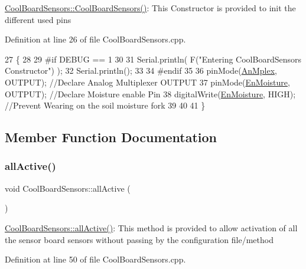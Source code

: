 \hyperlink{class_cool_board_sensors_a91ff2a02f5486f90cf2413a1cf8a9ed4}{Cool\+Board\+Sensors\+::\+Cool\+Board\+Sensors()}\+: This Constructor is provided to init the different used pins 

Definition at line 26 of file Cool\+Board\+Sensors.\+cpp.


\begin{DoxyCode}
27 \{
28 
29 \textcolor{preprocessor}{#if DEBUG == 1}
30 
31     Serial.println( F(\textcolor{stringliteral}{"Entering CoolBoardSensors Constructor"}) );
32     Serial.println();
33 
34 \textcolor{preprocessor}{#endif}
35     
36     pinMode(\hyperlink{class_cool_board_sensors_a12ef28b1046219e0aee10bf64e28c4a5}{AnMplex}, OUTPUT);                \textcolor{comment}{//Declare Analog Multiplexer OUTPUT}
37     pinMode(\hyperlink{class_cool_board_sensors_a6177d02e14a057a2f171a2e930b5038d}{EnMoisture}, OUTPUT);             \textcolor{comment}{//Declare Moisture enable Pin}
38     digitalWrite(\hyperlink{class_cool_board_sensors_a6177d02e14a057a2f171a2e930b5038d}{EnMoisture}, HIGH);            \textcolor{comment}{//Prevent Wearing on the soil moisture fork}
39 
40 
41 \}
\end{DoxyCode}


\subsection{Member Function Documentation}
\mbox{\label{class_cool_board_sensors_aa432c5aac88f89c31a10766390f23e0b}} 
\subsubsection{\texorpdfstring{all\+Active()}{allActive()}}
{\footnotesize\ttfamily void Cool\+Board\+Sensors\+::all\+Active (\begin{DoxyParamCaption}{ }\end{DoxyParamCaption})}

\hyperlink{class_cool_board_sensors_aa432c5aac88f89c31a10766390f23e0b}{Cool\+Board\+Sensors\+::all\+Active()}\+: This method is provided to allow activation of all the sensor board sensors without passing by the configuration file/method 

Definition at line 50 of file Cool\+Board\+Sensors.\+cpp.


